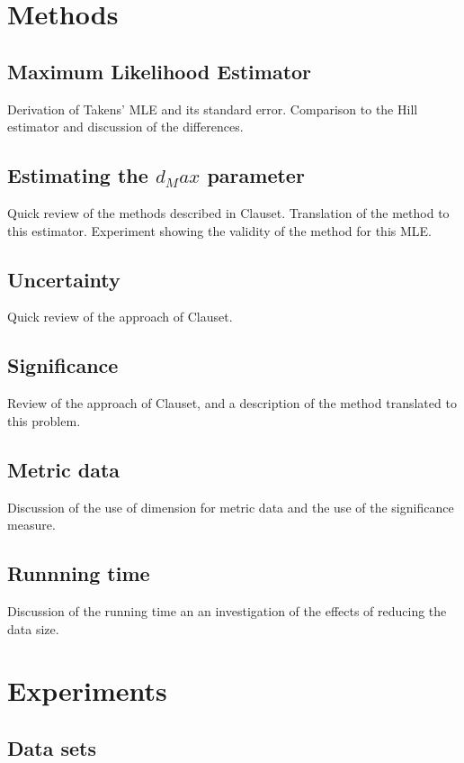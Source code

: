 \documentclass{article}
\theoremstyle{definition}
\begin{document}
\section{Methods}

\subsection{Maximum Likelihood Estimator}

Derivation of Takens' MLE and its standard error. Comparison to the Hill estimator and discussion of the differences.
 
\subsection{Estimating the $d_Max$ parameter}

Quick review of the methods described in Clauset. Translation of the method to this estimator. Experiment showing the validity of the method for this MLE.

\subsection{Uncertainty}

Quick review of the approach of Clauset.

\subsection{Significance}

Review of the approach of Clauset, and a description of the method translated to this problem.

\subsection{Metric data}

Discussion of the use of dimension for metric data and the use of the significance measure.

\subsection{Runnning time}

Discussion of the running time an an investigation of the effects of reducing the data size.
\section{Experiments}
\subsection{Data sets}
\end{document}
